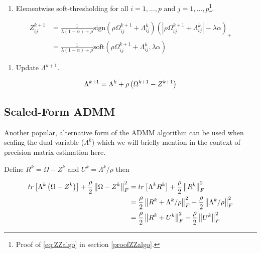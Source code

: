 \documentclass[11pt,]{report}
\providecommand{\tightlist}{%
  \setlength{\itemsep}{0pt}\setlength{\parskip}{0pt}}
\theoremstyle{definition}
\theoremstyle{definition}
\theoremstyle{definition}
\theoremstyle{remark}
\begin{document}
\begin{enumerate}
\def\labelenumi{\arabic{enumi}.}
\setcounter{enumi}{1}
\tightlist
\item
  Elementwise soft-thresholding for all \(i = 1,..., p\) and \(j = 1,..., p\)\footnote{Proof of \eqref{eq:ZZalgo} in section \ref{proofZZalgo}.}.
\end{enumerate}

\begin{equation}
\begin{split}
Z_{ij}^{k + 1} &= \frac{1}{\lambda(1 - \alpha) + \rho}\mbox{sign}\left(\rho\Omega_{ij}^{k + 1} + \Lambda_{ij}^{k}\right)\left( \left| \rho\Omega_{ij}^{k + 1} + \Lambda_{ij}^{k} \right| - \lambda\alpha \right)_{+} \\
&= \frac{1}{\lambda(1 - \alpha) + \rho}\mbox{soft}\left(\rho\Omega_{ij}^{k + 1} + \Lambda_{ij}^{k}, \lambda\alpha\right)
\label{eq:ZZalgo}
\end{split}
\end{equation}

\begin{enumerate}
\def\labelenumi{\arabic{enumi}.}
\setcounter{enumi}{2}
\tightlist
\item
  Update \(\Lambda^{k + 1}\).
\end{enumerate}

\begin{equation}
\Lambda^{k + 1} = \Lambda^{k} + \rho\left( \Omega^{k + 1} - Z^{k + 1} \right)
\label{eq:lamalgo}\notag
\end{equation}

\hypertarget{scaled-form-admm}{%
\subsection{Scaled-Form ADMM}\label{scaled-form-admm}}

Another popular, alternative form of the ADMM algorithm can be used when scaling the dual variable (\(\Lambda^{k}\)) which we will briefly mention in the context of precision matrix estimation here.

Define \(R^{k} = \Omega - Z^{k}\) and \(U^{k} = \Lambda^{k}/\rho\) then

\begin{equation}
\begin{split}
  tr\left[ \Lambda^{k}\left( \Omega - Z^{k} \right) \right] + \frac{\rho}{2}\left\| \Omega - Z^{k} \right\|_{F}^{2} &= tr\left[ \Lambda^{k}R^{k} \right] + \frac{\rho}{2}\left\| R^{k} \right\|_{F}^{2} \\
  &= \frac{\rho}{2}\left\| R^{k} + \Lambda^{k}/\rho \right\|_{F}^{2} - \frac{\rho}{2}\left\| \Lambda^{k}/\rho \right\|_{F}^{2} \\
  &= \frac{\rho}{2}\left\| R^{k} + U^{k} \right\|_{F}^{2} - \frac{\rho}{2}\left\| U^{k} \right\|_{F}^{2}
\label{eq:scaled}\notag
\end{split}
\end{equation}
\end{document}
